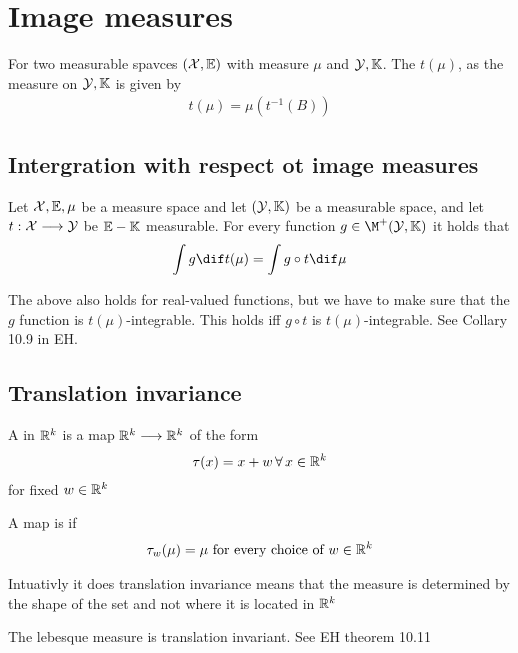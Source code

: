 \section[Lecture 4]{Image measures} %
\label{sec:image_measures}
\begin{defn}
For two measurable spavces \(({\mathcal{X}},{\mathbb{E}})\)  with measure \(\mu\) and \({\mathcal{Y}},{\mathbb{K}}\). The  \(t(\mu)\), as the measure on \({\mathcal{Y}},{\mathbb{K}}\) is given by
\begin{align}
    t(\mu)=\mu\left(t^{-1}(B)\right)
\end{align}
\end{defn}
\subsection{Intergration with respect ot image measures} %
\label{sub:intergration_with_respect_ot_image_measures}
\begin{defn}
Let \({\mathcal{X}},{\mathbb{E}},\mu\) be a measure space and let \(({\mathcal{Y}},{\mathbb{K}})\)  be a measurable space, and let \(t: {\mathcal{X}}\longrightarrow{\mathcal{Y}}\) be \({\mathbb{E}}-{\mathbb{K}}\) measurable. For every function \(g\in\M^+(\Y,\K)\) it holds that
\begin{equation}
      \int g \dif t(\mu)=\int g\circ t \dif \mu
\end{equation}
\end{defn}
\begin{rem}
The above also holds for real-valued functions, but we have to make sure that the \(g\) function is \(t(\mu)\)-integrable. This holds iff \(g\circ t\)  is \(t(\mu)\)-integrable. See Collary 10.9 in EH.
\end{rem}
\subsection{Translation invariance} %
\label{sub:translation_invariance}
\begin{defn}
	A  in \({\mathbb{R}}^k\) is a map \({\mathbb{R}}^k \longrightarrow {\mathbb{R}}^k\) of the form
	\begin{align}
	    \tau(x)=x+w\, \forall \, x\in{\mathbb{R}}^k
	\end{align}
	for fixed \(w\in{\mathbb{R}}^k\)
\end{defn}

A map is  if
\begin{align}
    \tau_w(\mu)=\mu \text{ for every choice of } w\in{\mathbb{R}}^k
\end{align}

\begin{rem}
Intuativly it does translation invariance means that the measure is determined by the shape of the set and not where it is located in \({\mathbb{R}}^k\)
\end{rem}
\begin{rem}
The lebesque measure is translation invariant. See EH theorem 10.11
\end{rem}

